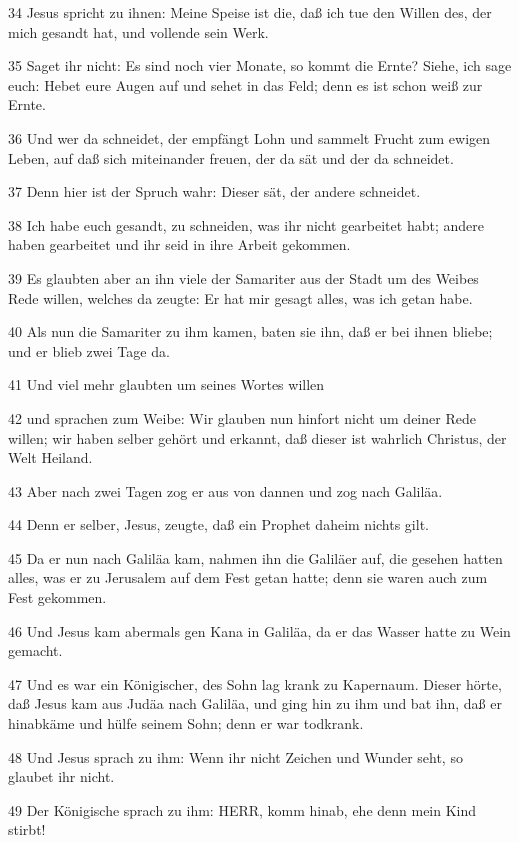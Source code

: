 \par 34 Jesus spricht zu ihnen: Meine Speise ist die, daß ich tue den Willen des, der mich gesandt hat, und vollende sein Werk.
\par 35 Saget ihr nicht: Es sind noch vier Monate, so kommt die Ernte? Siehe, ich sage euch: Hebet eure Augen auf und sehet in das Feld; denn es ist schon weiß zur Ernte.
\par 36 Und wer da schneidet, der empfängt Lohn und sammelt Frucht zum ewigen Leben, auf daß sich miteinander freuen, der da sät und der da schneidet.
\par 37 Denn hier ist der Spruch wahr: Dieser sät, der andere schneidet.
\par 38 Ich habe euch gesandt, zu schneiden, was ihr nicht gearbeitet habt; andere haben gearbeitet und ihr seid in ihre Arbeit gekommen.
\par 39 Es glaubten aber an ihn viele der Samariter aus der Stadt um des Weibes Rede willen, welches da zeugte: Er hat mir gesagt alles, was ich getan habe.
\par 40 Als nun die Samariter zu ihm kamen, baten sie ihn, daß er bei ihnen bliebe; und er blieb zwei Tage da.
\par 41 Und viel mehr glaubten um seines Wortes willen
\par 42 und sprachen zum Weibe: Wir glauben nun hinfort nicht um deiner Rede willen; wir haben selber gehört und erkannt, daß dieser ist wahrlich Christus, der Welt Heiland.
\par 43 Aber nach zwei Tagen zog er aus von dannen und zog nach Galiläa.
\par 44 Denn er selber, Jesus, zeugte, daß ein Prophet daheim nichts gilt.
\par 45 Da er nun nach Galiläa kam, nahmen ihn die Galiläer auf, die gesehen hatten alles, was er zu Jerusalem auf dem Fest getan hatte; denn sie waren auch zum Fest gekommen.
\par 46 Und Jesus kam abermals gen Kana in Galiläa, da er das Wasser hatte zu Wein gemacht.
\par 47 Und es war ein Königischer, des Sohn lag krank zu Kapernaum. Dieser hörte, daß Jesus kam aus Judäa nach Galiläa, und ging hin zu ihm und bat ihn, daß er hinabkäme und hülfe seinem Sohn; denn er war todkrank.
\par 48 Und Jesus sprach zu ihm: Wenn ihr nicht Zeichen und Wunder seht, so glaubet ihr nicht.
\par 49 Der Königische sprach zu ihm: HERR, komm hinab, ehe denn mein Kind stirbt!
